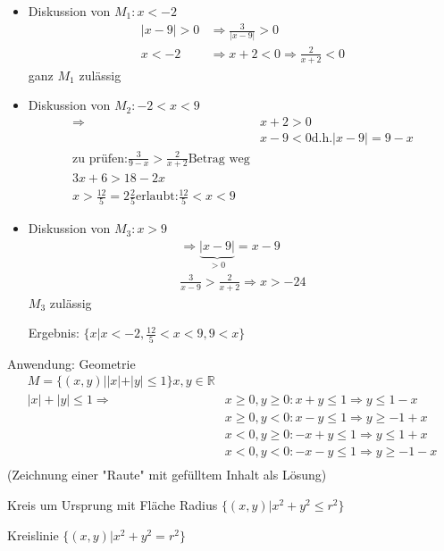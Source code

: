 \documentclass[a4paper,10pt]{book}
\begin{document}
\begin{itemize}
 \item Diskussion von $M_1: x < -2$
\begin{align*}
|x-9|>0 &\Rightarrow \frac{3}{|x-9|} > 0 \\
x<-2 &\Rightarrow x+2<0 \Rightarrow \frac{2}{x+2}<0
\end{align*}
ganz $M_1$ zulässig
 \item Diskussion von $M_2: -2<x<9$
\begin{align*}
\Rightarrow &x+2 > 0 \\
&x-9<0 \textrm{d.h.} |x-9|=9-x \\
\textrm{zu prüfen:}
\frac{3}{9-x} > \frac{2}{x+2} \textrm{Betrag weg} \\
3x+6 > 18-2x \\
x > \frac{12}{5} = 2 \frac{2}{5}
\textrm{erlaubt:} \frac{12}{5}<x<9
\end{align*}
 \item Diskussion von $M_3: x>9$
\begin{align*}
 \Rightarrow \underbrace{|x-9|}_{>0} = x-9 \\
\frac{3}{x-9} > \frac{2}{x+2}
\Rightarrow x>-24
\end{align*}
$M_3$ zulässig

Ergebnis: $\{x|x<-2, \frac{12}{5}<x<9, 9<x\}$
\end{itemize}

Anwendung: Geometrie
\begin{align*}
M = \{(x,y)| |x|+|y| \leq 1 \} x,y \in \mathbb{R} \\
|x|+|y| \leq 1 \Rightarrow &x \geq 0, y \geq 0: x+y \leq 1 \Rightarrow y \leq 1-x \\
	&x \geq 0, y < 0: x-y \leq 1 \Rightarrow y \geq -1+x \\
	&x < 0, y \geq 0: -x+y \leq 1 \Rightarrow y \leq 1+x \\
	&x < 0, y < 0: -x-y \leq 1 \Rightarrow y \geq -1-x \\
\end{align*}
(Zeichnung einer "Raute" mit gefülltem Inhalt als Lösung)

Kreis um Ursprung mit Fläche
Radius $\{(x,y)| x^2+y^2\leq r^2 \}$

Kreislinie $\{(x,y)| x^2+y^2 = r^2 \}$
\end{document}
